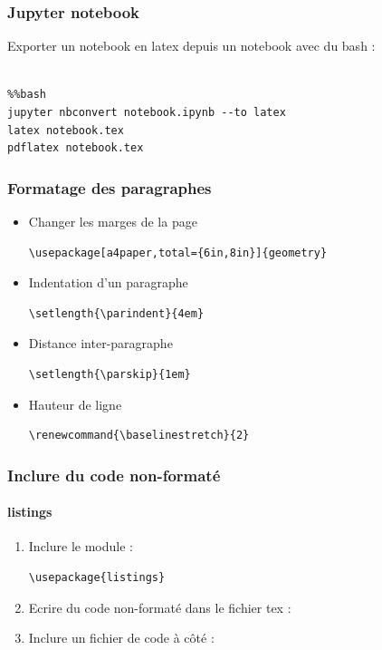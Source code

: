 \documentclass{beamer}
\begin{document}
\begin{frame}[fragile]
    \frametitle{Jupyter notebook}
Exporter un notebook en latex depuis un notebook avec du bash :
    \begin{lstlisting}
    
%%bash
jupyter nbconvert notebook.ipynb --to latex
latex notebook.tex
pdflatex notebook.tex
    \end{lstlisting}

\end{frame}

\begin{frame}[fragile]
    \frametitle{Formatage des paragraphes}
     \begin{itemize}
     \item<1-> Changer les marges de la page
     \begin{lstlisting}
\usepackage[a4paper,total={6in,8in}]{geometry}
     \end{lstlisting}
     \item<2-> Indentation d'un paragraphe
     \begin{lstlisting}
\setlength{\parindent}{4em}
     \end{lstlisting}
     \item<3-> Distance inter-paragraphe
     \begin{lstlisting}
\setlength{\parskip}{1em}
     \end{lstlisting}
     \item<4-> Hauteur de ligne
     \begin{lstlisting}
\renewcommand{\baselinestretch}{2}
     \end{lstlisting}
     \end{itemize}
\end{frame}

\begin{frame}[fragile]
    \frametitle{Inclure du code non-formaté}
    \framesubtitle{listings}
       \begin{enumerate}
       \item<1-> Inclure le module :
     \begin{lstlisting}
\usepackage{listings}      
     \end{lstlisting}
       \item<2-> Ecrire du code non-formaté dans le fichier tex :

       \item<3-> Inclure un fichier de code à côté :
     \begin{lstlisting}[language=TeX]
       
     \end{lstlisting}
       \end{enumerate}
\end{frame}
\end{document}
